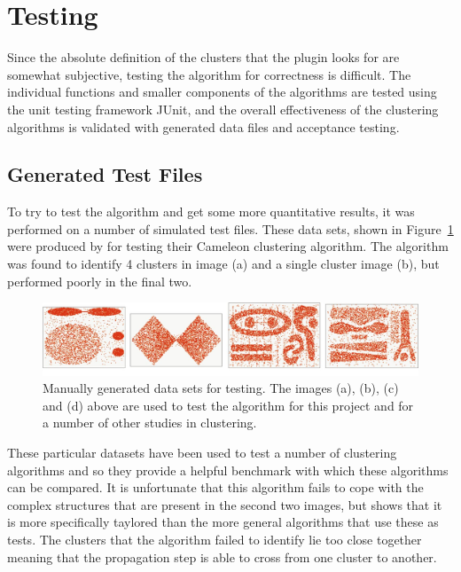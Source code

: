 
\section{Testing}
\label{sec:testing}

Since the absolute definition of the clusters that the plugin looks for are
somewhat subjective, testing the algorithm for correctness is difficult. The
individual functions and smaller components of the algorithms are tested using
the unit testing framework JUnit\cite{tahchiev2010junit}, and the overall
effectiveness of the clustering algorithms is validated with generated data
files and acceptance testing.

\subsection{Generated Test Files}
\label{sub:generated_test_files}

To try to test the algorithm and get some more quantitative results, it was
performed on a number of simulated test files. These data sets, shown in
Figure~\ref{fig:cam-tests} were produced by \citet{karypis1999chameleon} for
testing their Cameleon clustering algorithm. The algorithm was found to
identify 4 clusters in image (a) and a single cluster image (b), but performed
poorly in the final two.

\begin{figure}[tbh]
	\centering
	\includegraphics[width=0.9\linewidth]{cam-tests.png}
	\caption[Manually generated data sets for testing]{Manually generated data
		sets for testing. The images (a), (b), (c) and (d) above are used to
		test the algorithm for this project and for a number of other studies
		in clustering.}\label{fig:cam-tests}
\end{figure}

These particular datasets have been used to test a number of clustering
algorithms and so they provide a helpful benchmark with which these algorithms
can be compared. It is unfortunate that this algorithm fails to cope with the
complex structures that are present in the second two images, but shows that it
is more specifically taylored than the more general algorithms that use these
as tests. The clusters that the algorithm failed to identify lie too close
together meaning that the propagation step is able to cross from one cluster to
another.

